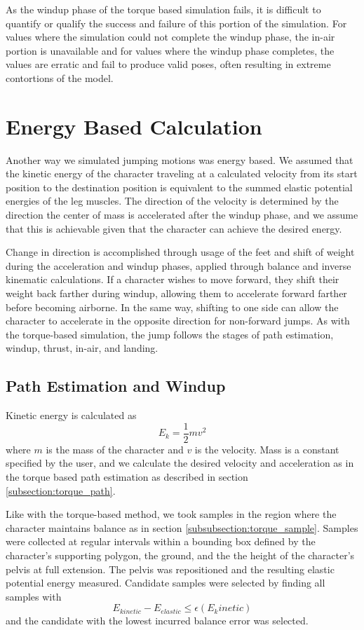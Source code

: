 As the windup phase of the torque based simulation fails, it is difficult to quantify or qualify the success and failure of this portion of the simulation.  For values where the simulation could not complete the windup phase, the in-air portion is unavailable and for values where the windup phase completes, the values are erratic and fail to produce valid poses, often resulting in extreme contortions of the model.


\section{Energy Based Calculation}
\label{section:energy}
Another way we simulated jumping motions was energy based.  We assumed that the kinetic energy of the character traveling at a calculated velocity from its start position to the destination position is equivalent to the summed elastic potential energies of the leg muscles.  The direction of the velocity is determined by the direction the center of mass is accelerated after the windup phase, and we assume that this is achievable given that the character can achieve the desired energy.  

Change in direction is accomplished through usage of the feet and shift of weight during the acceleration and windup phases, applied through balance and inverse kinematic calculations.  If a character wishes to move forward, they shift their weight back farther during windup, allowing them to accelerate forward farther before becoming airborne.  In the same way, shifting to one side can allow the character to accelerate in the opposite direction for non-forward jumps.  As with the torque-based simulation, the jump follows the stages of path estimation, windup, thrust, in-air, and landing.

\subsection{Path Estimation and Windup}
\label{subsection:energy_path}
Kinetic energy is calculated as \[ E_k = \frac{1}{2} m v^2 \] where $m$ is the mass of the character and $v$ is the velocity.  Mass is a constant specified by the user, and we calculate the desired velocity and acceleration as in the torque based path estimation as described in section \ref{subsection:torque_path}.

Like with the torque-based method, we took samples in the region where the character maintains balance as in section \ref{subsubsection:torque_sample}.  Samples were collected at regular intervals within a bounding box defined by the character's supporting polygon, the ground, and the the height of the character's pelvis at full extension.  The pelvis was repositioned and the resulting elastic potential energy measured.  Candidate samples were selected by finding all samples with \[ E_{kinetic} - E_{elastic} \le \epsilon(E_kinetic)\] and the candidate with the lowest incurred balance error was selected.

